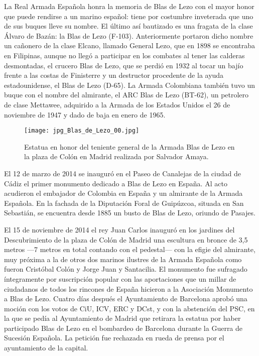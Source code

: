 
La Real Armada Española  honra la memoria de
Blas de Lezo con el mayor honor que puede
rendirse a un marino español: tiene por costumbre inveterada que uno
de sus buques lleve su nombre. El último así bautizado es una fragata
de la clase Álvaro de Bazán: la Blas de Lezo (F-103). Anteriormente
portaron dicho nombre un cañonero de la clase Elcano, llamado General
Lezo, que en 1898 se encontraba en Filipinas, aunque no llegó a
participar en los combates al tener las calderas desmontadas, el
crucero Blas de Lezo, que se perdió en 1932 al tocar un bajío frente a
las costas de Finisterre y un destructor procedente de la ayuda
estadounidense, el Blas de Lezo (D-65). La Armada Colombiana
 también tuvo un buque con el nombre del
almirante, el ARC Blas de Lezo (BT-62), un petrolero de clase
Mettawee, adquirido a la Armada de los Estados Unidos  el 26 de noviembre de 1947 y dado de baja en enero de 1965.

\begin{figure}[!hbp]
\centering
\texttt{[image: jpg\_Blas\_de\_Lezo\_00.jpg]}
\caption{\label{fig:donBlas01} Estatua en honor del teniente general
  de la Armada Blas de Lezo en la plaza de Colón en Madrid realizada
  por Salvador Amaya.}
\end{figure}

El 12 de marzo de 2014 se inauguró en el Paseo de Canalejas de la
ciudad de Cádiz el primer monumento dedicado a Blas de Lezo en
España. Al acto acudieron el embajador de Colombia en España y un
almirante de la Armada Española. En la
fachada de la Diputación Foral de Guipúzcoa, situada en San Sebastián,
se encuentra desde 1885 un busto de Blas de Lezo, oriundo de Pasajes.

El 15 de noviembre de 2014 el rey Juan Carlos inauguró en los jardines
del Descubrimiento de la plaza de Colón de Madrid una escultura en
bronce de 3,5 metros ---7 metros en total contando con el pedestal---
con la efigie del almirante, muy próxima a la de otros dos marinos
ilustres de la Armada Española como fueron Cristóbal Colón y Jorge
Juan y Santacilia. El monumento fue sufragado íntegramente por
suscripción popular con las aportaciones que un millar de ciudadanos
de todos los rincones de España hicieron a la Asociación Monumento a
Blas de Lezo.  Cuatro días después el Ayuntamiento
de Barcelona aprobó una moción con los votos de CiU, ICV, ERC y DCst,
y con la abstención del PSC, en la que se pedía al Ayuntamiento de
Madrid que retirara la estatua por haber participado Blas de Lezo en
el bombardeo de Barcelona durante la Guerra de Sucesión Española. La
petición fue rechazada en rueda de prensa por el ayuntamiento de la
capital.

